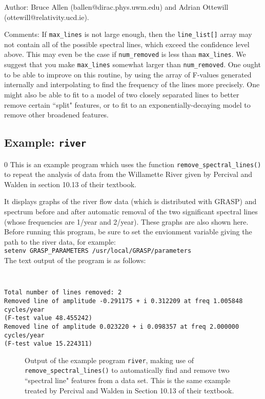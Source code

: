 \begin{description}
\item{Author:}
Bruce Allen (ballen@dirac.phys.uwm.edu) and Adrian Ottewill
(ottewill@relativity.ucd.ie).
\item{Comments:}
If {\tt max\_lines} is not large enough, then the {\tt line\_list[]}
array may not contain all of the possible spectral lines, which exceed the
confidence level above.  This may even be the case if {\tt num\_removed}
is less than {\tt max\_lines}.  We suggest that you make {\tt max\_lines}
somewhat larger than {\tt num\_removed}.  One ought to be able to improve
on this routine, by using the array of F-values generated internally
and interpolating to find the frequency of the lines more precisely.
One might also be able to fit to a model of two closely separated
lines to better remove certain ``split" features, or to fit to an
exponentially-decaying model to remove other broadened features.
\end{description}
\clearpage

\subsection{Example: {\tt river} }
\setcounter{equation}0
This is an example program which uses the function {\tt remove\_spectral\_lines()}
to repeat the analysis of data from the Willamette River given by Percival and Walden
in section 10.13 of their textbook.

It displays graphs of the river flow data (which is distributed with
GRASP) and spectrum before and after automatic removal of the two
significant spectral lines (whose frequencies are 1/year and 2/year).
These graphs are also shown here.  Before running this program, be sure to set the envionment
variable giving the path to the river data, for example:\\
{\tt setenv GRASP\_PARAMETERS /usr/local/GRASP/parameters}\\
The text output of the program is as follows:
{\tt
\begin{verbatim}
Total number of lines removed: 2
Removed line of amplitude -0.291175 + i 0.312209 at freq 1.005848 cycles/year
(F-test value 48.455242)
Removed line of amplitude 0.023220 + i 0.098357 at freq 2.000000 cycles/year
(F-test value 15.224311)
\end{verbatim}
}
\begin{figure}[hb]
\begin{center}

\caption{ \label{f:williamette} 
Output of the example program {\tt river}, making use of {\tt
remove\_spectral\_lines()} to automatically find and remove two ``spectral
line" features from a data set.  This is the same example treated by
Percival and Walden in Section 10.13 of their textbook.
}
\end{center}
\end{figure}

